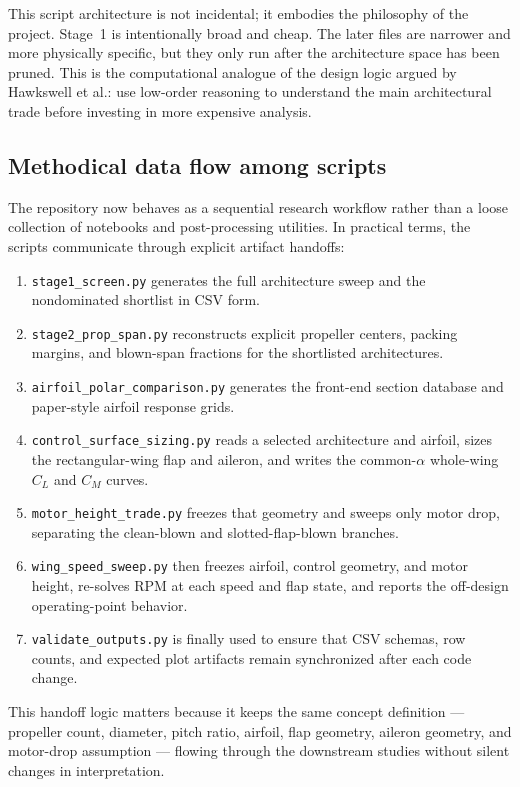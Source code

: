 \documentclass[conf]{new-aiaa}
\begin{document}
This script architecture is not incidental; it embodies the philosophy of the project. Stage~1 is intentionally broad and cheap. The later files are narrower and more physically specific, but they only run after the architecture space has been pruned. This is the computational analogue of the design logic argued by Hawkswell et al.: use low-order reasoning to understand the main architectural trade before investing in more expensive analysis.\cite{Hawkswell2022}

\subsection{Methodical data flow among scripts}

The repository now behaves as a sequential research workflow rather than a loose collection of notebooks and post-processing utilities. In practical terms, the scripts communicate through explicit artifact handoffs:
\begin{enumerate}
\item \texttt{stage1\_screen.py} generates the full architecture sweep and the nondominated shortlist in CSV form.
\item \texttt{stage2\_prop\_span.py} reconstructs explicit propeller centers, packing margins, and blown-span fractions for the shortlisted architectures.
\item \texttt{airfoil\_polar\_comparison.py} generates the front-end section database and paper-style airfoil response grids.
\item \texttt{control\_surface\_sizing.py} reads a selected architecture and airfoil, sizes the rectangular-wing flap and aileron, and writes the common-\(\alpha\) whole-wing \(C_L\) and \(C_M\) curves.
\item \texttt{motor\_height\_trade.py} freezes that geometry and sweeps only motor drop, separating the clean-blown and slotted-flap-blown branches.
\item \texttt{wing\_speed\_sweep.py} then freezes airfoil, control geometry, and motor height, re-solves RPM at each speed and flap state, and reports the off-design operating-point behavior.
\item \texttt{validate\_outputs.py} is finally used to ensure that CSV schemas, row counts, and expected plot artifacts remain synchronized after each code change.
\end{enumerate}
This handoff logic matters because it keeps the same concept definition --- propeller count, diameter, pitch ratio, airfoil, flap geometry, aileron geometry, and motor-drop assumption --- flowing through the downstream studies without silent changes in interpretation.
\end{document}
